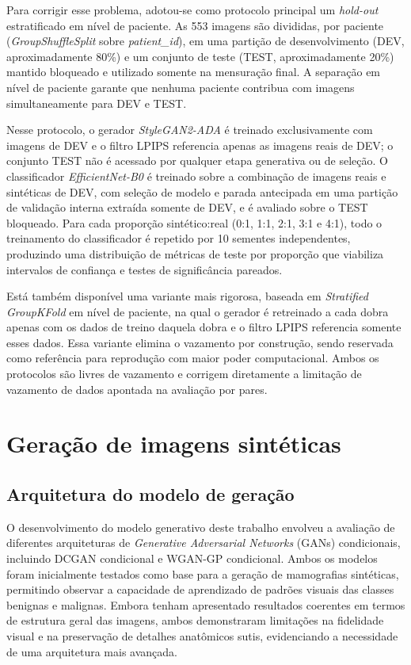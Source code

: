 \documentclass[
	12pt,				%
	openright,			%
	oneside,			%
	a4paper,			%
	tcc,			%
	]{ABNT-DC-UEL}
\begin{document}
Para corrigir esse problema, adotou-se como protocolo principal um \textit{hold-out} estratificado em nível de paciente. As 553 imagens são divididas, por paciente (\textit{GroupShuffleSplit} sobre \textit{patient\_id}), em uma partição de desenvolvimento (DEV, aproximadamente 80\%) e um conjunto de teste (TEST, aproximadamente 20\%) mantido bloqueado e utilizado somente na mensuração final. A separação em nível de paciente garante que nenhuma paciente contribua com imagens simultaneamente para DEV e TEST.

Nesse protocolo, o gerador \textit{StyleGAN2-ADA} é treinado exclusivamente com imagens de DEV e o filtro LPIPS referencia apenas as imagens reais de DEV; o conjunto TEST não é acessado por qualquer etapa generativa ou de seleção. O classificador \textit{EfficientNet-B0} é treinado sobre a combinação de imagens reais e sintéticas de DEV, com seleção de modelo e parada antecipada em uma partição de validação interna extraída somente de DEV, e é avaliado sobre o TEST bloqueado. Para cada proporção sintético:real (0:1, 1:1, 2:1, 3:1 e 4:1), todo o treinamento do classificador é repetido por 10 sementes independentes, produzindo uma distribuição de métricas de teste por proporção que viabiliza intervalos de confiança e testes de significância pareados.

Está também disponível uma variante mais rigorosa, baseada em \textit{Stratified GroupKFold} em nível de paciente, na qual o gerador é retreinado a cada dobra apenas com os dados de treino daquela dobra e o filtro LPIPS referencia somente esses dados. Essa variante elimina o vazamento por construção, sendo reservada como referência para reprodução com maior poder computacional. Ambos os protocolos são livres de vazamento e corrigem diretamente a limitação de vazamento de dados apontada na avaliação por pares.

\section{Geração de imagens sintéticas}

\subsection{Arquitetura do modelo de geração}

O desenvolvimento do modelo generativo deste trabalho envolveu a avaliação de diferentes arquiteturas de \textit{Generative Adversarial Networks} (GANs) condicionais, incluindo DCGAN condicional e WGAN-GP condicional. Ambos os modelos foram inicialmente testados como base para a geração de mamografias sintéticas, permitindo observar a capacidade de aprendizado de padrões visuais das classes benignas e malignas. Embora tenham apresentado resultados coerentes em termos de estrutura geral das imagens, ambos demonstraram limitações na fidelidade visual e na preservação de detalhes anatômicos sutis, evidenciando a necessidade de uma arquitetura mais avançada.
\end{document}
